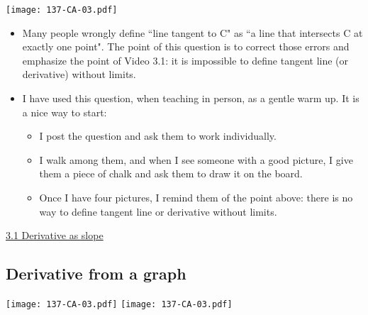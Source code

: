 \documentclass[11pt]{article}
\newcommand{\nl}{\hfill \vspace{-1.1\baselineskip}} %
\newcommand{\vi}{\hspace{8mm} \href{https://www.youtube.com/watch?v=7vhux5TLRmQ&list=PLlwePzQY_wW8qiZD6XYqCnibdY37ygbx7&index=1}{3.1 Derivative as slope}}
\begin{document}
\begin{center}
{ \texttt{[image: 137-CA-03.pdf]}}
\end{center}


\begin{comments}
\nl
	\begin{itemize}
		\item  Many people wrongly define ``line tangent to C" as ``a line that intersects C at exactly one point".    The point of this question is to correct those errors and emphasize the point of Video 3.1: it is impossible to define tangent line (or derivative) without limits.
		\item  I have used this question, when teaching in person, as a gentle warm up.  It is a nice way to start:
			\begin{itemize}
				\item	 I post the question and ask them to work individually.  
				\item I walk among them, and when I see someone with a good picture, I give them a piece of chalk and ask them to draw it on the board.   
				\item Once I have four pictures, I remind them of the point above: there is no way to define tangent line or derivative without limits.
			\end{itemize}
	\end{itemize}
\end{comments}

\begin{videos}
\vi
\end{videos}


\newpage
\subsection{Derivative from a graph} 

\begin{center}
{ \texttt{[image: 137-CA-03.pdf]}} \quad
{ \texttt{[image: 137-CA-03.pdf]}}
\end{center}
\end{document}
